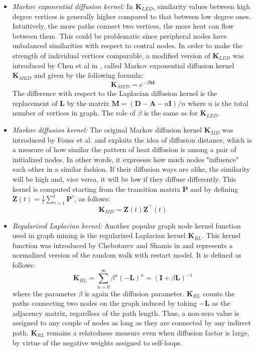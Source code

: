 \documentclass{article}
\begin{document}
\begin{itemize}
\item \textit{Markov exponential diffusion kernel:} In $\textbf{K}_{LED}$, similarity values between high degree vertices is generally higher compared to that between low degree ones. Intuitively, the more paths connect two vertices, the more heat can flow between them. This could be problematic since peripheral nodes have unbalanced similarities with respect to central nodes. In order to make the strength of individual vertices comparable, a modified version of $\textbf{K}_{LED}$ was introduced by Chen et al in \cite{mrf}, called Markov exponential diffusion kernel $\textbf{K}_{MED}$ and given by the following formula:
\begin{equation} \label{MEDK-formula}
\textbf{K}_{MED} = e^{-\beta \textbf{M}}
\end{equation}
The difference with respect to the Laplacian diffusion kernel is the replacement of $\textbf{L}$ by the matrix $\textbf{M}=(\textbf{D}-\textbf{A}-n\textbf{I})/n$ where $n$ is the total number of vertices in graph. The role of $\beta$ is the same as for $\textbf{K}_{LED}$.

\item \textit{Markov diffusion kernel:} The original Markov diffusion kernel $\textbf{K}_{MD}$ was introduced by Fouss et al. \cite{mdk} and exploits the idea of diffusion distance, which is a measure of how similar the pattern of heat diffusion is among a pair of initialized nodes. In other words, it expresses how much nodes "influence" each other in a similar fashion. If their diffusion ways are alike, the similarity will be high and, vice versa, it will be low if they diffuse differently. This kernel is computed starting from the transition matrix $\textbf{P}$ and by defining $\textbf{Z}(t) = \frac{1}{t}\sum_{\tau=1}^{t}\textbf{P}^{\tau}$, as follows:
\begin{equation} \label{MDK-formula}
\textbf{K}_{MD} = \textbf{Z}(t)\textbf{Z}^{\top}(t)
\end{equation}

\item \textit{Regularized Laplacian kernel:} Another popular graph node kernel function used in graph mining is the regularized Laplacian kernel $\textbf{K}_{RL}$. This kernel function was introduced by Chebotarev and Shamis in \cite{rlk} and represents a normalized version of the random walk with restart model. It is defined as follows:
\begin{equation} \label{RLK-formula}
\textbf{K}_{RL} = \sum_{n=0}^{\infty}\beta^{n}(-\textbf{L})^n = (\textbf{I} + \beta \textbf{L})^{-1}
\end{equation}
where the parameter $\beta$ is again the diffusion parameter. $\textbf{K}_{RL}$ counts the paths connecting two nodes on the graph induced by taking $-\textbf{L}$ as the adjacency matrix, regardless of the path length. Thus, a non-zero value is assigned to any couple of nodes as long as they are connected by any indirect path. $\textbf{K}_{RL}$ remains a relatedness measure even when diffusion factor is large, by virtue of the negative weights assigned to self-loops.
\end{itemize}
\end{document}
